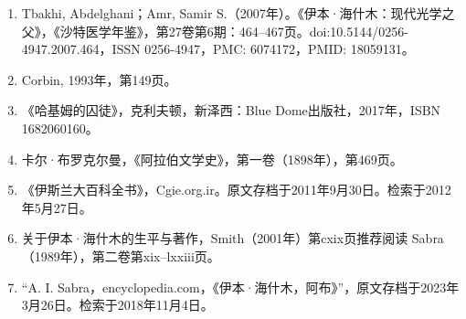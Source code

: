\begin{enumerate}
\item Tbakhi, Abdelghani；Amr, Samir S.（2007年）。《伊本·海什木：现代光学之父》，《沙特医学年鉴》，第27卷第6期：464–467页。doi:10.5144/0256-4947.2007.464，ISSN 0256-4947，PMC: 6074172，PMID: 18059131。
\item Corbin, 1993年，第149页。
\item 《哈基姆的囚徒》，克利夫顿，新泽西：Blue Dome出版社，2017年，ISBN 1682060160。
\item 卡尔·布罗克尔曼，《阿拉伯文学史》，第一卷（1898年），第469页。
\item 《伊斯兰大百科全书》，Cgie.org.ir。原文存档于2011年9月30日。检索于2012年5月27日。
\item 关于伊本·海什木的生平与著作，Smith（2001年）第cxix页推荐阅读 Sabra（1989年），第二卷第xix–lxxiii页。
\item “A. I. Sabra，encyclopedia.com，《伊本·海什木，阿布》”，原文存档于2023年3月26日。检索于2018年11月4日。


\end{enumerate}
